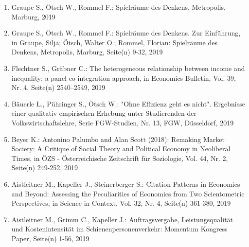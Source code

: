 \begin{enumerate}
	 \item Graupe S., Ötsch W., Rommel F.: Spielräume des Denkens, Metropolis, Marburg, 2019
	 \item Graupe S., Ötsch W., Rommel F.: Spielräume des Denkens. Zur Einführung, in Graupe, Silja; Ötsch, Walter O.; Rommel, Florian: Spielräume des Denkens, Metropolis, Marburg, Seite(n) 9-32, 2019
	 \item Flechtner S., Gräbner C.: The heterogeneous relationship between income and inequality: a panel co-integration approach, in Economics Bulletin, Vol. 39, Nr. 4, Seite(n) 2540–2549, 2019
	 \item Bäuerle L., Pühringer S., Ötsch W.: "Ohne Effizienz geht es nicht". Ergebnisse einer qualitativ-empirischen Erhebung unter Studierenden der Volkswirtschaftslehre, Serie FGW-Studien, Nr. 13, FGW, Düsseldorf, 2019
	 \item Beyer K.: Antonino Palumbo and Alan Scott (2018): Remaking Market Society: A Critique of Social Theory and Political Economy in Neoliberal Times, in ÖZS - Österreichische Zeitschrift für Soziologie, Vol. 44, Nr. 2, Seite(n) 249-252, 2019
	 \item Aistleitner M., Kapeller J., Steinerberger S.: Citation Patterns in Economics and Beyond: Assessing the Peculiarities of Economics from Two Scientometric Perspectives, in Science in Context, Vol. 32, Nr. 4, Seite(n) 361-380, 2019
	 \item Aistleitner M., Grimm C., Kapeller J.: Auftragsvergabe, Leistungsqualität und Kostenintensität im Schienenpersonenverkehr: Momentum Kongress Paper, Seite(n) 1-56, 2019
\end{enumerate}
